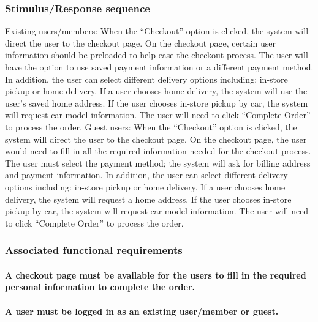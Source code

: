 \documentclass{scrreprt}
\theoremstyle{funreq}
\begin{document}
\subsubsection{Stimulus/Response sequence}
Existing users/members:
When the “Checkout” option is clicked, the system will direct the user to the checkout page. On the checkout page, certain user information should be preloaded to help ease the checkout process. The user will have the option to use saved payment information or a different payment method. In addition, the user can select different delivery options including: in-store pickup or home delivery. If a user chooses home delivery, the system will use the user's saved home address. If the user chooses in-store pickup by car, the system will request car model information. The user will need to click “Complete Order” to process the order.
Guest users: 
When the “Checkout” option is clicked, the system will direct the user to the checkout page. On the checkout page, the user would need to fill in all the required information needed for the checkout process. The user must select the payment method; the system will ask for billing address and payment information. In addition, the user can select different delivery options including: in-store pickup or home delivery. If a user chooses home delivery, the system will request a home address. If the user chooses in-store pickup by car, the system will request car model information. The user will need to click “Complete Order” to process the order.


\subsubsection{Associated functional requirements}

\paragraph[]{\normalfont A checkout page must be available for the users to fill in the required personal information to complete the order.}
\paragraph[]{\normalfont A user must be logged in as an existing user/member or guest.}
\end{document}
